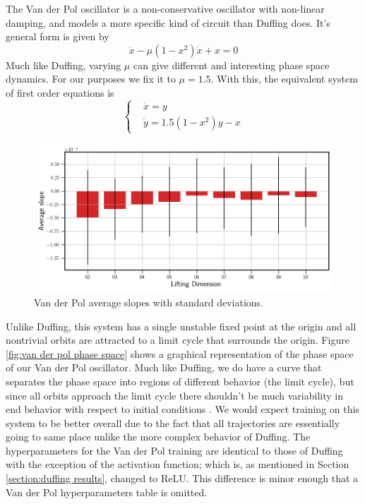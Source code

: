 The Van der Pol oscillator is a non-conservative oscillator with non-linear damping, and models a more 
specific kind of circuit than Duffing does. It's general form is given by 
\begin{equation}
    \ddot{x} - \mu(1 - x^2)\dot{x} + x = 0
\end{equation}
Much like Duffing, varying $\mu$ can give different and interesting phase space dynamics. For our
purposes we fix it to $\mu = 1.5$. With this, the equivalent system of first order equations
is 
\begin{equation}
    \begin{cases}
        & \dot{x} = y \\
        & \dot{y} = 1.5(1 - x^2)y - x  
    \end{cases}
\end{equation}

\begin{figure}[ht]
    \centering
    \begin{minipage}{\textwidth}
        \includegraphics[width=\textwidth]{"../Figures/van_der_pol_slope_linear_fit.png"} 
    \end{minipage}
    \caption{Van der Pol average slopes with standard deviations.}
    \label{fig:van der pol average slopes}
\end{figure}
Unlike Duffing, this system has a single unstable fixed point
at the origin and all nontrivial orbits are attracted to a limit cycle that surrounds the origin. 
Figure \ref{fig:van der pol phase space} shows a graphical representation of the phase space of our 
Van der Pol oscillator. Much like Duffing, we do have a curve that separates the phase space into 
regions of different behavior (the limit cycle), but since all orbits approach the limit cycle there
shouldn't be much variability in end behavior with respect to initial conditions \cite{strogatz:2000}. 
We would expect training on this system 
to be better overall due to the fact that all trajectories are essentially going to same place unlike
the more complex behavior of Duffing. The hyperparameters for the Van der Pol
training are identical to those of Duffing with the exception of the activation function; which is, 
as mentioned in Section \ref{section:duffing results}, changed to ReLU. This difference 
is minor enough that a Van der Pol hyperparameters table is omitted.

